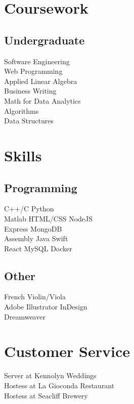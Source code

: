 \documentclass[]{deedy-resume-openfont}
\begin{document}
\begin{minipage}[t]{0.33\textwidth}
\sectionsep

\section{Coursework}
\subsection{Undergraduate}
Software Engineering\\
Web Programming\\
Applied Linear Algebra \\
Business Writing \\
Math for Data Analytics \\
Algorithms \\
Data Structures \\

\sectionsep


\section{Skills}
\subsection{Programming}
C++/C \textbullet{} Python \\ 
Matlab\textbullet{} HTML/CSS \textbullet{} NodeJS \\
 Express\textbullet{} MongoDB \\

Assembly \textbullet{} Java \textbullet{} Swift\\
React \textbullet{} MySQL \textbullet{} Docker \\
\sectionsep

\subsection{Other}
French \textbullet{}   Violin/Viola \\
Adobe Illustrator \textbullet{} InDesign \\ 
Dreamweaver\\ 


\section{Customer Service}
Server at Kennolyn Weddings\\
Hostess at La Gioconda Restaurant\\
Hostess at Seacliff Brewery \\

\sectionsep

%
%

\end{minipage} 
\end{document}

